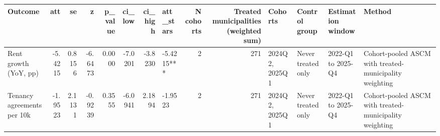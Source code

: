 \begin{tabular}{lrrrrrrlrrllll}
\toprule
Outcome & att & se & z & p_value & ci_low & ci_high & att_stars & N cohorts & Treated municipalities (weighted sum) & Cohorts & Control group & Estimation window & Method \\
\midrule
Rent growth (YoY, pp) & -5.4215 & 0.8156 & -6.6473 & 0.0000 & -7.0201 & -3.8230 & -5.4215*** & 2 & 271 & 2024Q2, 2025Q1 & Never treated only & 2022-Q1 to 2025-Q4 & Cohort-pooled ASCM with treated-municipality weighting \\
Tenancy agreements per 10k & -1.9523 & 2.1131 & -0.9239 & 0.3555 & -6.0941 & 2.1894 & -1.9523 & 2 & 271 & 2024Q2, 2025Q1 & Never treated only & 2022-Q1 to 2025-Q4 & Cohort-pooled ASCM with treated-municipality weighting \\
\bottomrule
\end{tabular}
